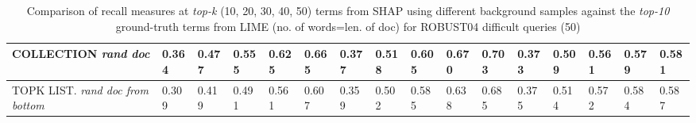 \begin{table}
{\begin{tabular}{ |m{6em}|m{2.8em}|m{2.8em}|m{2.8em}|m{2.8em}|m{2.8em}||m{2.8em}|m{2.8em}|m{2.8em}|m{2.8em}|m{2.8em}||m{2.8em}|m{2.8em}|m{2.8em}|m{2.8em}|m{2.8em}|| }



COLLECTION \newline \textit{rand doc} & 0.364 & 0.477 & 0.555 & 0.625 & 0.665 & 0.377 & 0.518 & 0.605 & 0.670 & 0.703 & 0.373 & 0.509 & 0.561 & 0.579 & 0.581\\
\hline

TOPK LIST. \newline \textit{rand doc from bottom} & 0.309 & 0.419 & 0.491 & 0.561 & 0.607 & 0.359 & 0.502 & 0.585 & 0.638 & 0.685 & 0.375 & 0.514 & 0.572 & 0.584 & 0.587\\
\hline

 \end{tabular}}
\caption{Comparison of recall measures at \textit{top-k} (10, 20, 30, 40, 50) terms from SHAP using different background samples against the \textit{top-10} ground-truth terms from LIME (no. of words=len. of doc) for ROBUST04 difficult queries (50)}
\label{table_diff_10_terms_recall_different}
\end{table}

